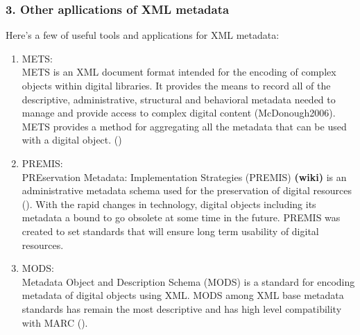 \documentclass[a4paper]{article} %
\begin{document}
\subsubsection*{3. Other apllications of XML metadata}
Here's a few of useful tools and applications for XML metadata:
\begin{enumerate}
\item METS:\\
METS is an XML document format intended for the encoding of complex objects within digital libraries. It provides the means to record all of the descriptive, administrative, structural and behavioral metadata needed to manage and provide access to complex digital content (McDonough2006). METS provides a method for aggregating all the metadata that can be used with a digital object. ({\bf \cite{Sharon Cheslow:2014:METSForTheCulturalHeritageCommunity}})

\item PREMIS:\\
PREservation Metadata: Implementation Strategies (PREMIS) {\bf(wiki)} is an administrative metadata schema used for the preservation of digital resources ({\bf \cite{Sharon Cheslow:2014:METSForTheCulturalHeritageCommunity}}). With the rapid changes in technology, digital objects including its metadata a bound to go obsolete at some time in the future. PREMIS was created to set standards that will ensure long term usability of digital resources. 

\item MODS:\\
Metadata Object and Description Schema (MODS) is a standard for encoding metadata of digital objects using XML. MODS among XML base metadata standards has remain the most descriptive and has high level compatibility with MARC ({\bf \cite{Rebecca Guenther:2003:NewMetadataStandardsforDigitalResources}}).

\end{enumerate}




\end{document}
